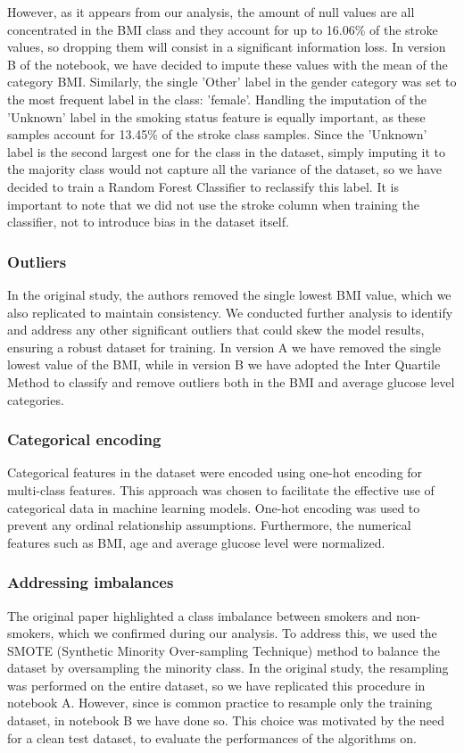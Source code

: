 \documentclass[twocolumn, 9pt]{extarticle}
\begin{document}
However, as it appears from our analysis, the amount of null values are all concentrated in the BMI class and they account for up to 16.06\% of the stroke values, so dropping them will consist in a significant information loss. In version B of the notebook, we have decided to impute these values with the mean of the category BMI. Similarly, the single 'Other' label in the gender category was set to the most frequent label in the class: 'female'. Handling the imputation of the 'Unknown' label in the smoking status feature is equally important, as these samples account for 13.45\% of the stroke class samples. Since the 'Unknown' label is the second largest one for the class in the dataset, simply imputing it to the majority class would not capture all the variance of the dataset, so we have decided to train a Random Forest Classifier to reclassify this label. It is important to note that we did not use the stroke column when training the classifier, not to introduce bias in the dataset itself.

\subsubsection{Outliers}
In the original study, the authors removed the single lowest BMI value, which we also replicated to maintain consistency. We conducted further analysis to identify and address any other significant outliers that could skew the model results, ensuring a robust dataset for training. In version A we have removed the single lowest value of the BMI, while in version B we have adopted the Inter Quartile Method to classify and remove outliers both in the BMI and average glucose level categories.

\subsubsection{Categorical encoding}
Categorical features in the dataset were encoded using one-hot encoding for multi-class features. This approach was chosen to facilitate the effective use of categorical data in machine learning models. One-hot encoding was used to prevent any ordinal relationship assumptions. Furthermore, the numerical features such as BMI, age and average glucose level were normalized.

\subsubsection{Addressing imbalances}
The original paper highlighted a class imbalance between smokers and non-smokers, which we confirmed during our analysis. To address this, we used the SMOTE (Synthetic Minority Over-sampling Technique) method to balance the dataset by oversampling the minority class. In the original study, the resampling was performed on the entire dataset, so we have replicated this procedure in notebook A. However, since is common practice to resample only the training dataset, in notebook B we have done so. This choice was motivated by the need for a clean test dataset, to evaluate the performances of the algorithms on. 
\end{document}

